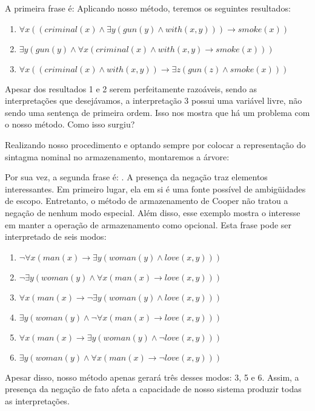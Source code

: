 A primeira frase é:  Aplicando nosso método, teremos os seguintes resultados:
\begin{enumerate}
\item $\forall x((criminal(x) \land \exists y (gun(y) \land with(x,y))) \rightarrow smoke(x))$
\item $\exists y(gun(y) \land \forall x(criminal(x) \land with(x,y) \rightarrow smoke(x)))$
\item $\forall x((criminal(x) \land with(x,y)) \rightarrow \exists z(gun(z) \land smoke(x))) $
\end{enumerate}

Apesar dos resultados 1 e 2 serem perfeitamente razoáveis, sendo as interpretações que desejávamos, a interpretação 3 possui uma variável livre, não sendo uma sentença de primeira ordem. Isso nos mostra que há um problema com o nosso método. Como isso surgiu?

Realizando nosso procedimento e optando sempre por colocar a representação do sintagma nominal no armazenamento, montaremos a árvore: 


Por sua vez, a segunda frase é:  . A presença da negação traz elementos interessantes. Em primeiro lugar, ela em si é uma fonte possível de ambigüidades de escopo. Entretanto, o método de armazenamento de Cooper não tratou a negação de nenhum modo especial. Além disso, esse exemplo mostra o interesse em manter a operação de armazenamento como opcional. Esta frase pode ser interpretado de seis modos:
\begin{enumerate}
\item $\neg \forall x (man(x) \rightarrow \exists y (woman(y) \land love(x,y))) $
\item $\neg \exists y(woman(y) \land \forall x(man(x) \rightarrow love(x,y)))$
\item $\forall x (man(x) \rightarrow \neg \exists y (woman(y) \land love(x,y)))$
\item $\exists y(woman(y) \land \neg \forall x(man(x) \rightarrow love(x,y)))$
\item $\forall x (man(x) \rightarrow \exists y (woman(y) \land \neg love(x,y)))$
\item $\exists y(woman(y) \land \forall x(man(x) \rightarrow \neg love(x,y)))$
\end{enumerate}

Apesar disso, nosso método apenas gerará três desses modos: 3, 5 e 6. Assim, a presença da negação de fato afeta a capacidade de nosso sistema produzir todas as interpretações.

